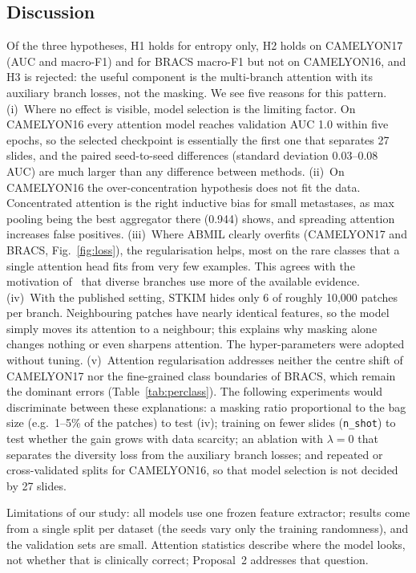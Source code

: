\documentclass[conference]{IEEEtran}
\begin{document}
\subsection{Discussion}
Of the three hypotheses, H1 holds for entropy only, H2 holds on CAMELYON17 (AUC and macro-F1) and for BRACS macro-F1 but not on CAMELYON16, and H3 is rejected: the useful component is the multi-branch attention with its auxiliary branch losses, not the masking. We see five reasons for this pattern.
(i)~Where no effect is visible, model selection is the limiting factor. On CAMELYON16 every attention model reaches validation AUC 1.0 within five epochs, so the selected checkpoint is essentially the first one that separates 27 slides, and the paired seed-to-seed differences (standard deviation 0.03--0.08 AUC) are much larger than any difference between methods.
(ii)~On CAMELYON16 the over-concentration hypothesis does not fit the data. Concentrated attention is the right inductive bias for small metastases, as max pooling being the best aggregator there (0.944) shows, and spreading attention increases false positives.
(iii)~Where ABMIL clearly overfits (CAMELYON17 and BRACS, Fig.~\ref{fig:loss}), the regularisation helps, most on the rare classes that a single attention head fits from very few examples. This agrees with the motivation of~\cite{zhang2024acmil} that diverse branches use more of the available evidence.
(iv)~With the published setting, STKIM hides only 6 of roughly 10{,}000 patches per branch. Neighbouring patches have nearly identical features, so the model simply moves its attention to a neighbour; this explains why masking alone changes nothing or even sharpens attention. The hyper-parameters were adopted without tuning.
(v)~Attention regularisation addresses neither the centre shift of CAMELYON17 nor the fine-grained class boundaries of BRACS, which remain the dominant errors (Table~\ref{tab:perclass}).
The following experiments would discriminate between these explanations: a masking ratio proportional to the bag size (e.g.\ 1--5\% of the patches) to test (iv); training on fewer slides (\texttt{n\_shot}) to test whether the gain grows with data scarcity; an ablation with $\lambda=0$ that separates the diversity loss from the auxiliary branch losses; and repeated or cross-validated splits for CAMELYON16, so that model selection is not decided by 27 slides.

Limitations of our study: all models use one frozen feature extractor; results come from a single split per dataset (the seeds vary only the training randomness), and the validation sets are small. Attention statistics describe where the model looks, not whether that is clinically correct; Proposal~2 addresses that question.
\end{document}
